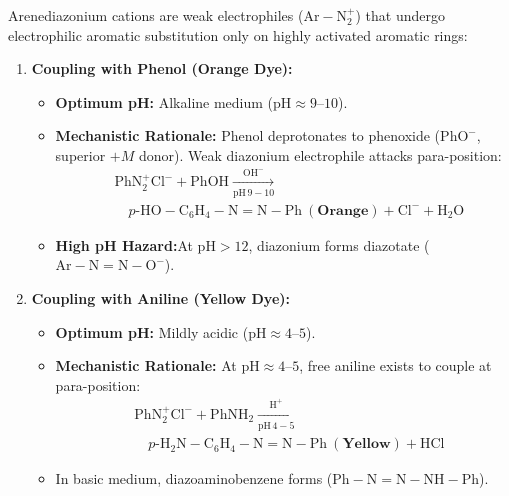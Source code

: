 \documentclass[10pt,twoside,openright]{book}
\begin{document}
\begin{conceptbox}
Arenediazonium cations are weak electrophiles ($\mathrm{Ar-N_2^+}$) that undergo electrophilic aromatic substitution only on highly activated aromatic rings:
\begin{enumerate}[leftmargin=*]
  \item \textbf{Coupling with Phenol (Orange Dye):}
  \begin{itemize}[leftmargin=*]
    \item \textbf{Optimum pH:} Alkaline medium ($\mathrm{pH} \approx 9\text{--}10$).
    \item \textbf{Mechanistic Rationale:} Phenol deprotonates to phenoxide ($\mathrm{PhO^-}$, superior $+M$ donor). Weak diazonium electrophile attacks para-position:
    \begin{align*}
      &\mathrm{PhN_2^+Cl^-} + \mathrm{PhOH} \xrightarrow[\mathrm{pH\, 9-10}]{\mathrm{OH^-}} \\
      &\quad p\text{-}\mathrm{HO-C_6H_4-N=N-Ph} \ (\textbf{Orange}) + \mathrm{Cl^-} + \mathrm{H_2O}
    \end{align*}
    \item \textbf{High pH Hazard:}\newline At $\mathrm{pH} > 12$, diazonium forms diazotate ($\mathrm{Ar-N=N-O^-}$).
  \end{itemize}
  \item \textbf{Coupling with Aniline (Yellow Dye):}
  \begin{itemize}[leftmargin=*]
    \item \textbf{Optimum pH:} Mildly acidic ($\mathrm{pH} \approx 4\text{--}5$).
    \item \textbf{Mechanistic Rationale:} At $\mathrm{pH} \approx 4\text{--}5$, free aniline exists to couple at para-position:
    \begin{align*}
      &\mathrm{PhN_2^+Cl^-} + \mathrm{PhNH_2} \xrightarrow[\mathrm{pH\, 4-5}]{\mathrm{H^+}} \\
      &\quad p\text{-}\mathrm{H_2N-C_6H_4-N=N-Ph} \ (\textbf{Yellow}) + \mathrm{HCl}
    \end{align*}
    \item In basic medium, diazoaminobenzene forms ($\mathrm{Ph-N=N-NH-Ph}$).
  \end{itemize}
\end{enumerate}
\end{conceptbox}
\end{document}
